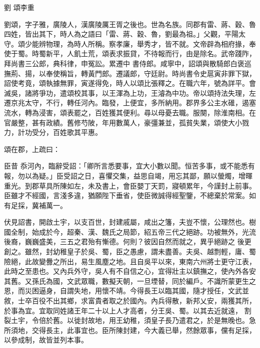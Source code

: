 
\begin{pinyinscope}

 劉
 頌李重



 劉頌，字子雅，廣陵人，漢廣陵厲王胥之後也。世為名族。同郡有雷、蔣、穀、魯四姓，皆出其下，時人為之語曰「雷、蔣、穀、魯，劉最為祖。」父觀，平陽太守。頌少能辨物理，為時人所稱。察孝廉，舉秀才，皆不就。文帝辟為相府掾，奉使于蜀。時蜀新平，人飢土荒，頌表求振貸，不待報而行，由是除名。武帝踐阼，拜尚書三公郎，典科律，申冤訟。累遷中
 書侍郎。咸寧中，詔頌與散騎郎白褒巡撫荊、揚，以奉使稱旨，轉黃門郎。遷議郎，守廷尉。時尚書令史扈寅非罪下獄，詔使考竟，頌執據無罪，寅遂得免，時人以頌比張釋之。在職六年，號為詳平。會滅吳，諸將爭功，遣頌校其事，以王渾為上功，王濬為中功。帝以頌持法失理，左遷京兆太守，不行，轉任河內。臨發，上便宜，多所納用。郡界多公主水碓，遏塞流水，轉為浸害，頌表罷之，百姓獲其便利。尋以母憂去職。服闋，除淮南相。在官嚴整，甚有政績。舊修芍陂，年用數萬人，豪彊兼並，孤貧失業，頌使大小戮力，計功受分，百姓歌其平惠。



 頌在郡，上疏曰：



 臣昔
 忝河內，臨辭受詔：「卿所言悉要事，宜大小數以聞。恒苦多事，或不能悉有報，勿以為疑。」臣受詔之日，喜懼交集，益思自竭，用忘其鄙，願以螢燭，增暉重光。到郡草具所陳如左，未及書上，會臣嬰丁天罰，寢頓累年，今謹封上前事。臣雖才不經國，言淺多違，猶願陛下垂省，使臣微誠得經聖鑒，不總棄於常案。如有足採，冀補萬一。



 伏見詔書，開啟土宇，以支百世，封建戚屬，咸出之籓，夫豈不懷，公理然也。樹國全制，始成於今，超秦、漢、魏氏之局節，紹五帝三代之絕跡。功被無外，光流後裔，巍巍盛美，三五之君殆有慚德。何則？彼因自然而就之，異乎絕跡之
 後更創之。雖然，封幼稚皇子於吳、蜀，臣之愚慮，謂未盡善。夫吳、越剽輕，庸、蜀險絕，此故變釁之所出，易生風塵之地。且自吳平以來，東南六州將士更守江表，此時之至患也。又內兵外守，吳人有不自信之心，宜得壯主以鎮撫之，使內外各安其舊。又孫氏為國，文武眾職，數擬天朝，一旦堙替，同於編戶。不識所蒙更生之恩，而災困逼身，自謂失地，用懷不靖。今得長王以臨其國，隨才授任，文武並敘，士卒百役不出其鄉，求富貴者取之於國內。內兵得散，新邦乂安，兩獲其所，於事為宜。宜取同姓諸王年二十以上人才高者，分王吳、蜀。以其去近就遠，
 割裂土宇，令倍於舊。以徙封故地，用王幼稚，須皇子長乃遣君之，於是無晚也。急所須地，交得長主，此事宜也。臣所陳封建，今大義已舉，然餘眾事，儻有足採，以參成制，故皆並列本事。




\end{pinyinscope}
